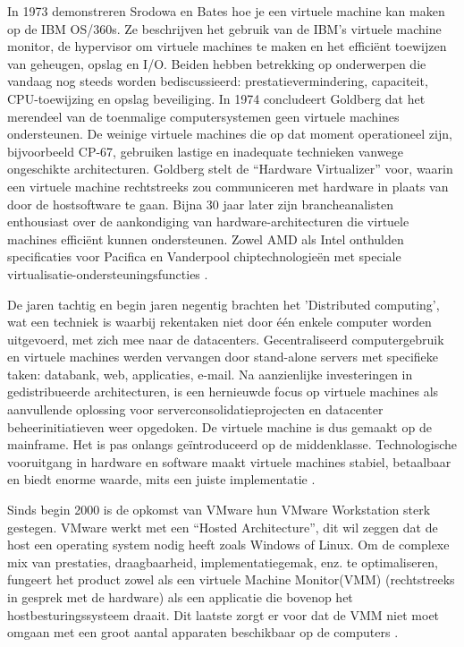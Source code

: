 In 1973 demonstreren Srodowa en Bates hoe je een virtuele machine kan maken op de IBM OS/360s. Ze beschrijven het gebruik van de IBM's virtuele machine monitor, de hypervisor om virtuele machines te maken en het efficiënt toewijzen van geheugen, opslag en I/O. Beiden hebben betrekking op onderwerpen die vandaag nog steeds worden bediscussieerd: prestatievermindering, capaciteit, CPU-toewijzing en opslag beveiliging. In 1974 concludeert Goldberg dat het merendeel van de toenmalige computersystemen geen virtuele machines ondersteunen. De weinige virtuele machines die op dat moment operationeel zijn, bijvoorbeeld CP-67, gebruiken lastige en inadequate technieken vanwege ongeschikte architecturen. Goldberg stelt de “Hardware Virtualizer” voor, waarin een virtuele machine rechtstreeks zou communiceren met hardware in plaats van door de hostsoftware te gaan. Bijna 30 jaar later zijn brancheanalisten enthousiast over de aankondiging van hardware-architecturen die virtuele machines efficiënt kunnen ondersteunen. Zowel AMD als Intel onthulden specificaties voor Pacifica en Vanderpool chiptechnologieën met speciale virtualisatie-ondersteuningsfuncties \autocite{Ameen2013}.

De jaren tachtig en begin jaren negentig brachten het 'Distributed computing', wat een techniek is waarbij rekentaken niet door één enkele computer worden uitgevoerd,  met zich mee naar de datacenters. Gecentraliseerd computergebruik en virtuele machines werden vervangen door stand-alone servers met specifieke taken: databank, web, applicaties, e-mail. Na aanzienlijke investeringen in gedistribueerde architecturen, is een hernieuwde focus op virtuele machines als aanvullende oplossing voor serverconsolidatieprojecten en datacenter beheerinitiatieven weer opgedoken. De virtuele machine is dus gemaakt op de mainframe. Het is pas onlangs geïntroduceerd op de middenklasse. Technologische vooruitgang in hardware en software maakt virtuele machines stabiel, betaalbaar en biedt enorme waarde, mits een juiste implementatie \autocite{Jeff2009}.

Sinds begin 2000 is de opkomst van VMware hun VMware Workstation sterk gestegen. VMware werkt met een “Hosted Architecture”, dit wil zeggen dat de host een operating system nodig heeft zoals Windows of Linux. Om de complexe mix van prestaties, draagbaarheid, implementatiegemak, enz. te optimaliseren, fungeert het product zowel als een virtuele Machine Monitor(VMM) (rechtstreeks in gesprek met de hardware) als  een applicatie die bovenop het hostbesturingssysteem draait. Dit laatste zorgt er voor dat de VMM niet moet omgaan met een groot aantal apparaten beschikbaar op de computers \autocite{Singh2004}.

